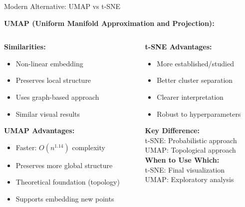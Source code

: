 \documentclass[10pt]{beamer}
\begin{document}
\begin{frame}{Modern Alternative: UMAP vs t-SNE}

\textbf{UMAP (Uniform Manifold Approximation and Projection):}

\vspace{0.15cm}
\begin{columns}
\begin{column}{0.5\textwidth}
\textbf{Similarities:}
\begin{itemize}
    \setlength\itemsep{0em}
    \item Non-linear embedding
    \item Preserves local structure
    \item Uses graph-based approach
    \item Similar visual results
\end{itemize}

\vspace{0.15cm}
\textbf{UMAP Advantages:}
\begin{itemize}
    \setlength\itemsep{0em}
    \item Faster: $O(n^{1.14})$ complexity
    \item Preserves more global structure
    \item Theoretical foundation (topology)
    \item Supports embedding new points
\end{itemize}
\end{column}
\begin{column}{0.5\textwidth}
\textbf{t-SNE Advantages:}
\begin{itemize}
    \setlength\itemsep{0em}
    \item More established/studied
    \item Better cluster separation
    \item Clearer interpretation
    \item Robust to hyperparameters
\end{itemize}

\vspace{0.15cm}
\textbf{Key Difference:}\\
\footnotesize
t-SNE: Probabilistic approach\\
UMAP: Topological approach\\

\vspace{0.15cm}
\textbf{When to Use Which:}\\
\footnotesize
t-SNE: Final visualization\\
UMAP: Exploratory analysis
\end{column}
\end{columns}


\end{frame}
\end{document}
